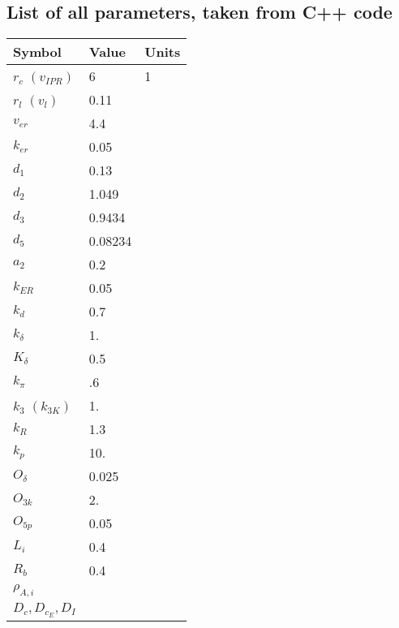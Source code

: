 \documentclass[11pt]{article}
\begin{document}
\subsection{List of all parameters, taken from C++ code}
\begin{table}[h]
\begin{tabular}{|lll|}
\hline
Symbol & Value & Units \\ \hline
$r_c$ $(v_{IPR})$ & 6 & 1 \\
$r_l$ $(v_l)$  & 0.11  &\\
$v_{er}$ & 4.4  &\\
$k_{er}$ & 0.05 &\\ \hline
$d_{1}$ & 0.13  &\\
$d_{2}$ & 1.049  &\\
$d_{3}$ & 0.9434 &\\
$d_{5}$ &  0.08234 &\\ \hline
$a_{2}$ &  0.2 &\\ \hline
$k_{ER}$ & 0.05 &\\
$k_{d}$ & 0.7 &\\
$k_{\delta}$ & 1. &\\
$K_{\delta}$ & 0.5  &\\
$k_{\pi}$ & .6 &\\
$k_3$ $(k_{3K})$ & 1. &\\     %
$k_R$ & 1.3 &\\
$k_p$ & 10. &\\ \hline
$O_{\delta}$ & 0.025 &\\
$O_{3k}$ & 2. &\\
$O_{5p}$ & 0.05 &\\ \hline
$L_i$ & 0.4 & \\ 
$R_b$ & 0.4 & \\  
$\rho_{A,i}$ & & \\  
$D_c, D_{c_E}, D_I$ & & \\ \hline
\end{tabular}
\end{table}

\end{document}
